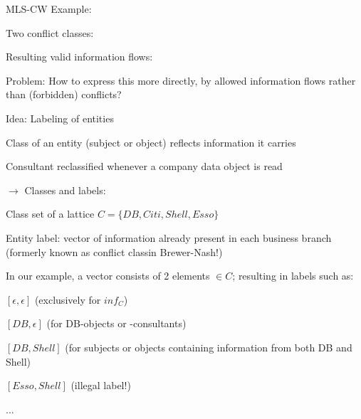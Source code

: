 \documentclass[a4paper]{article}
\begin{document}
\begin{multicols}{3}
    MLS-CW Example:
    \begin{itemize*}
        \item Two conflict classes: %
        \item Resulting valid information flows: %
        \item Problem: How to express this more directly, by allowed information flows rather than (forbidden) conflicts?
    \end{itemize*}

    Idea: Labeling of entities
    \begin{itemize*}
        \item Class of an entity (subject or object) reflects information it carries
        \item Consultant reclassified whenever a company data object is read
        \item $\rightarrow$ Classes and labels:
        \item Class set of a lattice $C=\{DB,Citi,Shell,Esso\}$
        \item Entity label: vector of information already present in each business branch (formerly known as conflict classin Brewer-Nash!)
        \item In our example, a vector consists of 2 elements $\in C$; resulting in labels such as:
        \begin{itemize*}
            \item $[\epsilon,\epsilon]$ (exclusively for $inf_C$)
            \item $[DB,\epsilon]$ (for DB-objects or -consultants)
            \item $[DB,Shell]$ (for subjects or objects containing information from both DB and Shell)
            \item $[Esso,Shell]$ (illegal label!)
            \item ...
        \end{itemize*}
    \end{itemize*}


\end{multicols}
\end{document}
